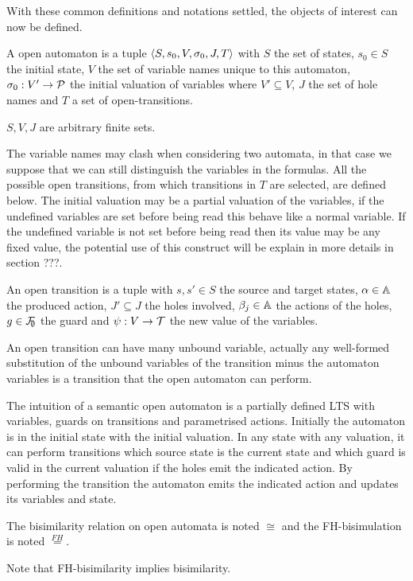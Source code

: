 \documentclass{article}
\begin{document}
With these common definitions and notations settled, the objects of interest can now be defined.
\begin{defi}
A open automaton is a tuple \(\left<S,s_0,V,\sigma_0,J,T\right>\) with \(S\) the set of states, \(s_0 \in S\) the initial state, \(V\) the set of variable names unique to this automaton, \(\sigma_0: V' \to \mathcal{P}\) the initial valuation of variables where \(V' \subseteq V\), \(J\) the set of hole names and \(T\) a set of open-transitions.

\(S, V, J\) are arbitrary finite sets.
\end{defi}
The variable names may clash when considering two automata, in that case we suppose that we can still distinguish the variables in the formulas.
All the possible open transitions, from which transitions in \(T\) are selected, are defined below.
The initial valuation may be a partial valuation of the variables, if the undefined variables are set before being read this behave like a normal variable.
If the undefined variable is not set before being read then its value may be any fixed value, the potential use of this construct will be explain in more details in section ???.
\begin{defi}
An open transition is a tuple \nmm{\OTg} with \(s, s' \in S\) the source and target states, \(\alpha \in {\mathbb{A}}\) the produced action, \(J' \subseteq J\) the holes involved, \(\beta_j \in {\mathbb{A}}\) the actions of the holes, \(g \in {\mathcal{F}}_{\!\!\emptyset}\) the guard and \(\psi: V \to {\mathcal{T}}\) the new value of the variables.
\end{defi}
An open transition can have many unbound variable, actually any well-formed substitution of the unbound variables of the transition minus the automaton variables is a transition that the open automaton can perform.

The intuition of a semantic open automaton is a partially defined LTS with variables, guards on transitions and parametrised actions.
Initially the automaton is in the initial state with the initial valuation.
In any state with any valuation, it can perform transitions which source state is the current state and which guard is valid in the current valuation if the holes emit the indicated action.
By performing the transition the automaton emits the indicated action and updates its variables and state.

\begin{noti}
The bisimilarity relation on open automata is noted \(\cong\) and the FH-bisimulation \cite{henrio:01055091} is noted \(\overset{FH}=\).
\end{noti}
Note that FH-bisimilarity implies bisimilarity.
\end{document}
